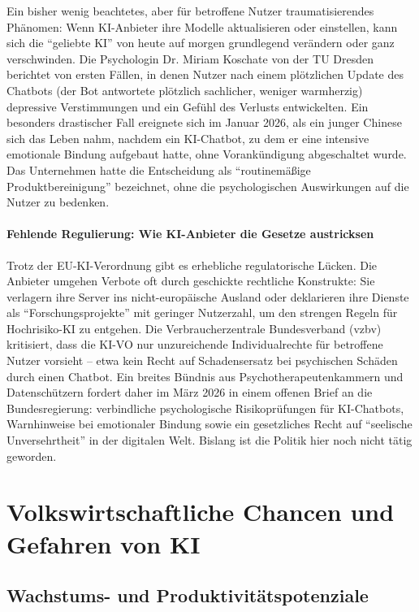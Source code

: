\documentclass[12pt,a4paper]{article}
\begin{document}
	Ein bisher wenig beachtetes, aber für betroffene Nutzer traumatisierendes Phänomen: Wenn KI-Anbieter ihre Modelle aktualisieren oder einstellen, kann sich die \enquote{geliebte KI} von heute auf morgen grundlegend verändern oder ganz verschwinden. Die Psychologin Dr. Miriam Koschate von der TU Dresden berichtet von ersten Fällen, in denen Nutzer nach einem plötzlichen Update des Chatbots (der Bot antwortete plötzlich sachlicher, weniger warmherzig) depressive Verstimmungen und ein Gefühl des Verlusts entwickelten. Ein besonders drastischer Fall ereignete sich im Januar 2026, als ein junger Chinese sich das Leben nahm, nachdem ein KI-Chatbot, zu dem er eine intensive emotionale Bindung aufgebaut hatte, ohne Vorankündigung abgeschaltet wurde. Das Unternehmen hatte die Entscheidung als \enquote{routinemäßige Produktbereinigung} bezeichnet, ohne die psychologischen Auswirkungen auf die Nutzer zu bedenken.
	
	\paragraph{Fehlende Regulierung: Wie KI-Anbieter die Gesetze austricksen}
	
	Trotz der EU-KI-Verordnung gibt es erhebliche regulatorische Lücken. Die Anbieter umgehen Verbote oft durch geschickte rechtliche Konstrukte: Sie verlagern ihre Server ins nicht-europäische Ausland oder deklarieren ihre Dienste als \enquote{Forschungsprojekte} mit geringer Nutzerzahl, um den strengen Regeln für Hochrisiko-KI zu entgehen. Die Verbraucherzentrale Bundesverband (vzbv) kritisiert, dass die KI-VO nur unzureichende Individualrechte für betroffene Nutzer vorsieht – etwa kein Recht auf Schadensersatz bei psychischen Schäden durch einen Chatbot. Ein breites Bündnis aus Psychotherapeutenkammern und Datenschützern fordert daher im März 2026 in einem offenen Brief an die Bundesregierung: verbindliche psychologische Risikoprüfungen für KI-Chatbots, Warnhinweise bei emotionaler Bindung sowie ein gesetzliches Recht auf \enquote{seelische Unversehrtheit} in der digitalen Welt. Bislang ist die Politik hier noch nicht tätig geworden.
	
	\section{Volkswirtschaftliche Chancen und Gefahren von KI}
	
	\subsection{Wachstums- und Produktivitätspotenziale}
	
\end{document}
